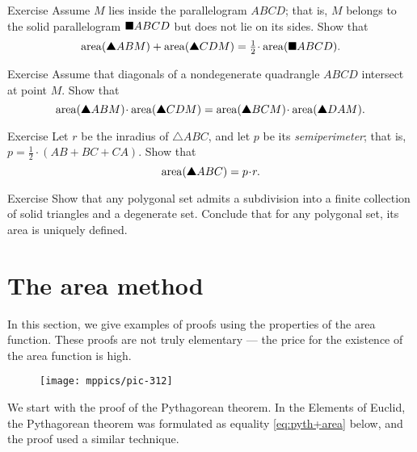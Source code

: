 {\begin{thm}{Exercise}\label{ex:half-parallelogram}
Assume $M$ lies inside the parallelogram $ABCD$;
that is, $M$ belongs to the solid parallelogram $\blacksquare ABCD$ but does not lie on its sides.
Show that
\[\area(\solidtriangle ABM)+\area(\solidtriangle CDM)
=\tfrac12\cdot \area(\solidsquare ABCD).\]
\end{thm}


\begin{thm}{Exercise}\label{ex:area-diag}
Assume that diagonals 
of a nondegenerate quadrangle $ABCD$ 
intersect at point $M$.
Show that 
\[\area(\solidtriangle ABM)\cdot\area(\solidtriangle CDM)
=
\area(\solidtriangle BCM)\cdot\area(\solidtriangle DAM).\]
 
\end{thm}

\begin{thm}{Exercise}\label{ex:area-inradius}
Let $r$ be the inradius of $\triangle ABC$,
and let $p$ be its {}\emph{semiperimeter};
that is, $p=\tfrac12\cdot(AB+BC+CA)$.
Show that
\[\area(\solidtriangle ABC)=p\cdot r.\]

\end{thm}



\begin{thm}{Exercise}\label{ex:subdivision}
Show that any polygonal set admits a subdivision into a finite collection of solid triangles and a degenerate set.
Conclude that for any polygonal set, its area is uniquely defined.
\end{thm}

\section{The area method}

In this section, we give examples of proofs using the properties of the area function.
These proofs are not truly elementary --- the price for the existence of the area function is high.

{

\begin{wrapfigure}{r}{20 mm}
\vskip-2mm
\centering
\texttt{[image: mppics/pic-312]}
\end{wrapfigure}

We start with the proof of the Pythagorean theorem.
In the Elements of Euclid, the Pythagorean theorem was formulated as equality  \ref{eq:pyth+area} below,
and the proof used a similar technique.

}}
